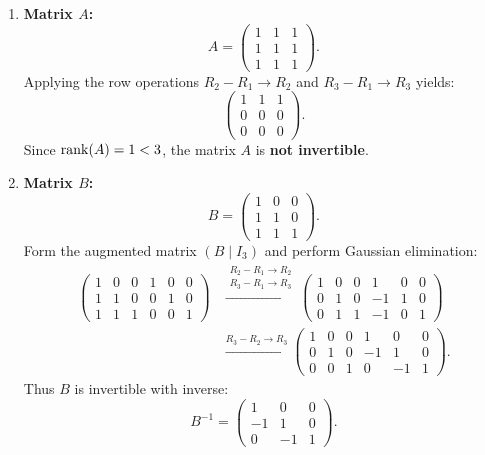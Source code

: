 \begin{exercisesolution*}
\label{sol:explicit_inversion_matrices}
\begin{enumerate}[label=\textbf{(\alph*)}]
    \item \textbf{Matrix $A$:}
    \[
    A = \begin{pmatrix} 1 & 1 & 1 \\ 1 & 1 & 1 \\ 1 & 1 & 1 \end{pmatrix}.
    \]
    Applying the row operations $R_2 - R_1 \to R_2$ and $R_3 - R_1 \to R_3$ yields:
    \[
    \begin{pmatrix} 1 & 1 & 1 \\ 0 & 0 & 0 \\ 0 & 0 & 0 \end{pmatrix}.
    \]
    Since $\operatorname{rank}(A) = 1 < 3$, the matrix $A$ is \textbf{not invertible}.

    \item \textbf{Matrix $B$:}
    \[
    B = \begin{pmatrix} 1 & 0 & 0 \\ 1 & 1 & 0 \\ 1 & 1 & 1 \end{pmatrix}.
    \]
    Form the augmented matrix $(B \mid I_3)$ and perform Gaussian elimination:
    \begin{align*}
    \left(\begin{array}{ccc|ccc}
    1 & 0 & 0 & 1 & 0 & 0 \\
    1 & 1 & 0 & 0 & 1 & 0 \\
    1 & 1 & 1 & 0 & 0 & 1
    \end{array}\right)
    &\xrightarrow{\substack{R_2 - R_1 \to R_2 \\ R_3 - R_1 \to R_3}}
    \left(\begin{array}{ccc|ccc}
    1 & 0 & 0 & 1 & 0 & 0 \\
    0 & 1 & 0 & -1 & 1 & 0 \\
    0 & 1 & 1 & -1 & 0 & 1
    \end{array}\right) \\
    &\xrightarrow{R_3 - R_2 \to R_3}
    \left(\begin{array}{ccc|ccc}
    1 & 0 & 0 & 1 & 0 & 0 \\
    0 & 1 & 0 & -1 & 1 & 0 \\
    0 & 0 & 1 & 0 & -1 & 1
    \end{array}\right).
    \end{align*}
    Thus $B$ is invertible with inverse:
    \[
    B^{-1} = \begin{pmatrix} 1 & 0 & 0 \\ -1 & 1 & 0 \\ 0 & -1 & 1 \end{pmatrix}.
    \]


\end{enumerate}
\end{exercisesolution*}
